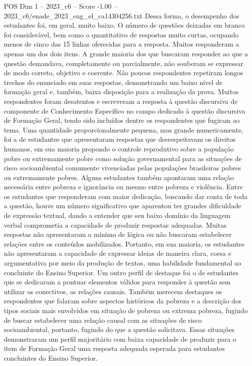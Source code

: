 \begin{textsample}{POS Dim 1 – 2023\_c6 – Score -1.00 – 2023\_c6/enade\_2023\_eng\_el\_ca14304256.txt}
Dessa forma, o desempenho dos estudantes foi, em geral, muito baixo.
O número de questões deixadas em branco foi considerável, bem como o quantitativo de respostas muito curtas, ocupando menos de cinco das 15 linhas oferecidas para a resposta.
Muitos responderam a apenas um dos dois itens.
A grande maioria dos que buscaram responder ao que a questão demandava, completamente ou parcialmente, não souberam se expressar de modo correto, objetivo e coerente.
Não poucos respondentes repetiram longos trechos do enunciado em suas respostas, demonstrando um baixo nível de formação geral e, também, baixa disposição para a realização da prova.
Muitos respondentes foram desatentos e escreveram a resposta à questão discursiva de componente de Conhecimento Específico no campo dedicado à questão discursiva de Formação Geral, tendo sido incluídos dentre os respondentes que fugiram ao tema.
Uma quantidade proporcionalmente pequena, mas grande numericamente, foi a de estudantes que apresentaram respostas que desrespeitavam os direitos humanos, em sua maioria propondo o controle reprodutivo sobre a população pobre ou extremamente pobre como solução governamental para as situações de risco socioambiental comumente vivenciadas pelas populações brasileiras pobres ou extremamente pobres.
Alguns estudantes também apontaram uma relação necessária entre pobreza e ignorância ou mesmo entre pobreza e violência.
Entre os estudantes que responderam com maior dedicação, buscando dar conta de toda a questão, houve um número significativo que aparentou ter grandes dificuldade de expressão textual, dando a entender que seu baixo domínio da linguagem verbal comprometia a capacidade de produzir respostas adequadas.
Muitas respostas não apresentaram o mínimo de lógica ou não buscaram estabelecer relações entre os conteúdos mobilizados.
Portanto, em sua maioria, os estudantes não apresentaram a capacidade de expressar ideias de maneira clara, coesa e argumentativa por meio da produção de textos, uma habilidade fundamental ao concluinte do Ensino Superior.
Um outro perfil de destaque foi o de estudantes que se dedicaram a pontuar elementos válidos para responder à questão sem utilizar os conectivos, as relações causais.
Também merecem destaques os respondentes que falaram sobre aspectos históricos da pobreza e a descrição dos tipos sociais mais envolvidos em situação de pobreza ou extrema pobreza, fugindo de buscar estabelecer uma relação causal com as situações de risco socioambiental, portanto, fugindo do que a questão solicitava.
Essas situações demonstraram um perfil majoritário com baixa capacidade de produzir para o item de Formação Geral uma resposta adequada esperada para estudantes concluintes do Ensino Superior.

\end{textsample}

